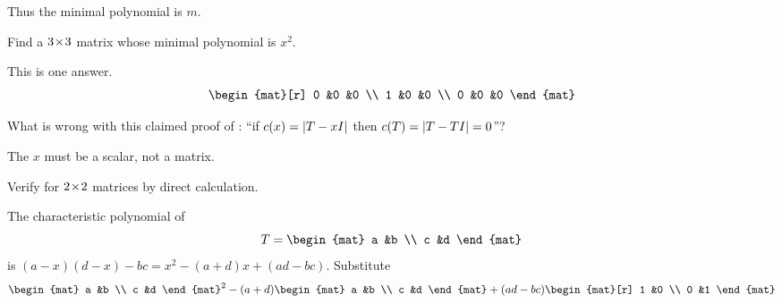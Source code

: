 \begin{exercises}
\begin{answer}
        Thus the minimal polynomial is $m$.
      \end{answer}
   \item 
     Find a \( 3 \! \times \! 3 \) matrix whose minimal
     polynomial is \( x^2 \).
     \begin{answer}
        This is one answer.
        \begin{equation*}
            \begin{mat}[r]
              0  &0  &0  \\
              1  &0  &0  \\
              0  &0  &0
            \end{mat}
        \end{equation*} 
      \end{answer}
  \item 
     What is wrong with this claimed proof of
     :
      ``if \( c(x)=\deter{T-xI} \) then \( c(T)=\deter{T-TI}=0 \)''?
     \cite{Cullen}
     \begin{answer}
       The \( x \) must be a scalar, not a matrix.
     \end{answer}
  \item 
    Verify  for \( 2 \! \times \! 2 \)
    matrices by direct calculation.
    \begin{answer}
      The characteristic polynomial of
      \begin{equation*}
         T=\begin{mat}
              a  &b  \\
              c  &d
           \end{mat}
      \end{equation*}
      is \( (a-x)(d-x)-bc=x^2-(a+d)x+(ad-bc) \).
      Substitute
      \begin{multline*}
         \begin{mat}
              a  &b  \\
              c  &d
         \end{mat}^2
         -
         (a+d)\begin{mat}
            a  &b  \\
            c  &d
         \end{mat}
         +
         (ad-bc)\begin{mat}[r]
            1  &0  \\
            0  &1
         \end{mat}                            \\

\end{multline*}
\end{answer}
\end{exercises}
